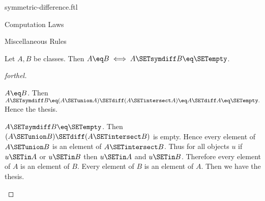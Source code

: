 \documentclass{naproche-library}
\begin{document}
\begin{smodule}[title=Symmetric Difference]{symmetric-difference.ftl}
\begin{sfragment}{Computation Laws}
\begin{sfragment}{Miscellaneous Rules}
    \begin{proposition}[forthel,id=FOUNDATIONS_03_6111806917443584]
      Let $A, B$ be classes.
      Then $A \eq B \iff A \SETsymdiff B \eq \SETempty$.
    \end{proposition}
    \begin{proof}[forthel]
      \begin{case}{$A \eq B$.}
        Then $A \SETsymdiff B
          \eq (A \SETunion A) \SETdiff (A \SETintersect A)
          \eq A \SETdiff A
          \eq \SETempty.$
        Hence the thesis.
      \end{case}

      \begin{case}{$A \SETsymdiff B \eq \SETempty$.}
        Then $(A \SETunion B) \SETdiff (A \SETintersect B)$ is empty.
        Hence every element of $A \SETunion B$ is an element of $A \SETintersect B$.
        Thus for all objects $u$ if $u \SETin A$ or $u \SETin B$ then $u \SETin A$ and $u \SETin B$.
        Therefore every element of $A$ is an element of $B$.
        Every element of $B$ is an element of $A$.
        Then we have the thesis.
      \end{case}
    \end{proof}
  \end{sfragment}
\end{sfragment}
\end{smodule}
\end{document}
